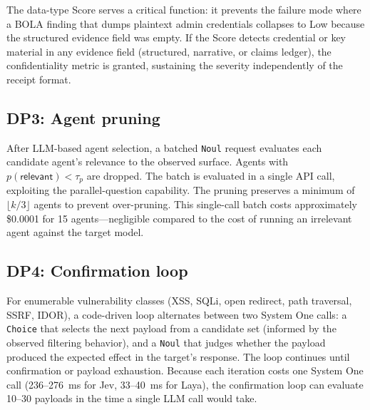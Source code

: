 \documentclass[conference]{IEEEtran}
\begin{document}
The data-type Score serves a critical function: it prevents the failure mode where a BOLA finding that dumps plaintext admin credentials collapses to Low because the structured evidence field was empty. If the Score detects credential or key material in any evidence field (structured, narrative, or claims ledger), the confidentiality metric is granted, sustaining the severity independently of the receipt format.

\subsection{DP3: Agent pruning}

After LLM-based agent selection, a batched \texttt{Noul} request evaluates each candidate agent's relevance to the observed surface. Agents with $p(\textsf{relevant}) < \tau_p$ are dropped. The batch is evaluated in a single API call, exploiting the parallel-question capability. The pruning preserves a minimum of $\lfloor k/3 \rfloor$ agents to prevent over-pruning. This single-call batch costs approximately \$0.0001 for 15 agents---negligible compared to the cost of running an irrelevant agent against the target model.

\subsection{DP4: Confirmation loop}

For enumerable vulnerability classes (XSS, SQLi, open redirect, path traversal, SSRF, IDOR), a code-driven loop alternates between two System One calls: a \texttt{Choice} that selects the next payload from a candidate set (informed by the observed filtering behavior), and a \texttt{Noul} that judges whether the payload produced the expected effect in the target's response. The loop continues until confirmation or payload exhaustion. Because each iteration costs one System One call (236--276~ms for Jev, 33--40~ms for Laya), the confirmation loop can evaluate 10--30 payloads in the time a single LLM call would take.
\end{document}
